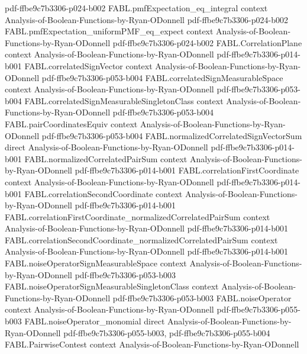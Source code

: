 \begin{theorem}
  {pdf-ffbe9c7b3306-p024-b002}
\proofstep
  {FABL.pmfExpectation_eq_integral}
  {context}
  {Analysis-of-Boolean-Functions-by-Ryan-ODonnell}
  {pdf-ffbe9c7b3306-p024-b002}
\proofstep
  {FABL.pmfExpectation_uniformPMF_eq_expect}
  {context}
  {Analysis-of-Boolean-Functions-by-Ryan-ODonnell}
  {pdf-ffbe9c7b3306-p024-b002}
\proofstep
  {FABL.CorrelationPlane}
  {context}
  {Analysis-of-Boolean-Functions-by-Ryan-ODonnell}
  {pdf-ffbe9c7b3306-p014-b001}
\proofstep
  {FABL.correlatedSignVector}
  {context}
  {Analysis-of-Boolean-Functions-by-Ryan-ODonnell}
  {pdf-ffbe9c7b3306-p053-b004}
\proofstep
  {FABL.correlatedSignMeasurableSpace}
  {context}
  {Analysis-of-Boolean-Functions-by-Ryan-ODonnell}
  {pdf-ffbe9c7b3306-p053-b004}
\proofstep
  {FABL.correlatedSignMeasurableSingletonClass}
  {context}
  {Analysis-of-Boolean-Functions-by-Ryan-ODonnell}
  {pdf-ffbe9c7b3306-p053-b004}
\proofstep
  {FABL.pairCoordinatesEquiv}
  {context}
  {Analysis-of-Boolean-Functions-by-Ryan-ODonnell}
  {pdf-ffbe9c7b3306-p053-b004}
\proofstep
  {FABL.normalizedCorrelatedSignVectorSum}
  {direct}
  {Analysis-of-Boolean-Functions-by-Ryan-ODonnell}
  {pdf-ffbe9c7b3306-p014-b001}
\proofstep
  {FABL.normalizedCorrelatedPairSum}
  {context}
  {Analysis-of-Boolean-Functions-by-Ryan-ODonnell}
  {pdf-ffbe9c7b3306-p014-b001}
\proofstep
  {FABL.correlationFirstCoordinate}
  {context}
  {Analysis-of-Boolean-Functions-by-Ryan-ODonnell}
  {pdf-ffbe9c7b3306-p014-b001}
\proofstep
  {FABL.correlationSecondCoordinate}
  {context}
  {Analysis-of-Boolean-Functions-by-Ryan-ODonnell}
  {pdf-ffbe9c7b3306-p014-b001}
\proofstep
  {FABL.correlationFirstCoordinate_normalizedCorrelatedPairSum}
  {context}
  {Analysis-of-Boolean-Functions-by-Ryan-ODonnell}
  {pdf-ffbe9c7b3306-p014-b001}
\proofstep
  {FABL.correlationSecondCoordinate_normalizedCorrelatedPairSum}
  {context}
  {Analysis-of-Boolean-Functions-by-Ryan-ODonnell}
  {pdf-ffbe9c7b3306-p014-b001}
\proofstep
  {FABL.noiseOperatorSignMeasurableSpace}
  {context}
  {Analysis-of-Boolean-Functions-by-Ryan-ODonnell}
  {pdf-ffbe9c7b3306-p053-b003}
\proofstep
  {FABL.noiseOperatorSignMeasurableSingletonClass}
  {context}
  {Analysis-of-Boolean-Functions-by-Ryan-ODonnell}
  {pdf-ffbe9c7b3306-p053-b003}
\proofstep
  {FABL.noiseOperator}
  {context}
  {Analysis-of-Boolean-Functions-by-Ryan-ODonnell}
  {pdf-ffbe9c7b3306-p055-b003}
\proofstep
  {FABL.noiseOperator_monomial}
  {direct}
  {Analysis-of-Boolean-Functions-by-Ryan-ODonnell}
  {pdf-ffbe9c7b3306-p055-b003,
    pdf-ffbe9c7b3306-p055-b004}
\proofstep
  {FABL.PairwiseContest}
  {context}
  {Analysis-of-Boolean-Functions-by-Ryan-ODonnell}

\end{theorem}
